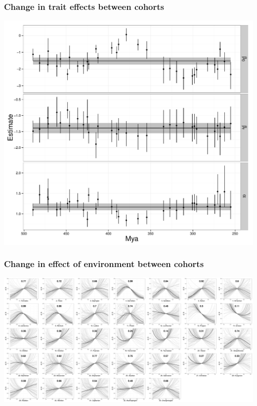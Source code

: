 \documentclass{beamer}
\begin{document}
\begin{frame}
  \frametitle{Change in trait effects between cohorts}
  
  \begin{center}
    \includegraphics[width = \textwidth,height = 0.8\textheight,keepaspectratio = true]{figure/cohort_series}
  \end{center}
\end{frame}

\begin{frame}
  \frametitle{Change in effect of environment between cohorts}
  
  \includegraphics[width = \textwidth,height = \textheight,keepaspectratio = true]{figure/cohort_quads}
\end{frame}
\end{document}
